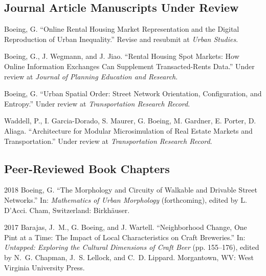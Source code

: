 \documentclass[12pt,letterpaper]{report}
\begin{document}
\subsection*{Journal Article Manuscripts Under Review}

\begin{tablist}

\item[\the\year] \tab Boeing, G. \enquote{Online Rental Housing Market Representation and the Digital Reproduction of Urban Inequality.} Revise and resubmit at \textit{Urban Studies}.

\item[\the\year] \tab Boeing, G., J. Wegmann, and J. Jiao. \enquote{Rental Housing Spot Markets: How Online Information Exchanges Can Supplement Transacted-Rents Data.} Under review at \textit{Journal of Planning Education and Research}.

\item[\the\year] \tab Boeing, G. \enquote{Urban Spatial Order: Street Network Orientation, Configuration, and Entropy.} Under review at \textit{Transportation Research Record}.

\item[\the\year] \tab Waddell, P., I. Garcia-Dorado, S. Maurer, G. Boeing, M. Gardner, E. Porter, D. Aliaga. \enquote{Architecture for Modular Microsimulation of Real Estate Markets and Transportation.} Under review at \textit{Transportation Research Record}.

\end{tablist}



\subsection*{Peer-Reviewed Book Chapters}

\begin{tablist}

\item[2018] \tab Boeing, G. \enquote{The Morphology and Circuity of Walkable and Drivable Street Networks.} In: \textit{Mathematics of Urban Morphology} (forthcoming), edited by L. D'Acci. Cham, Switzerland: Birkhäuser.

\item[2017] \tab Barajas, J.~M., G. Boeing, and J. Wartell. \enquote{Neighborhood Change, One Pint at a Time: The Impact of Local Characteristics on Craft Breweries.} In: \textit{Untapped: Exploring the Cultural Dimensions of Craft Beer} (pp. 155--176), edited by N.~G. Chapman, J.~S. Lellock, and C.~D. Lippard. Morgantown, WV: West Virginia University Press.

\end{tablist}
\end{document}
